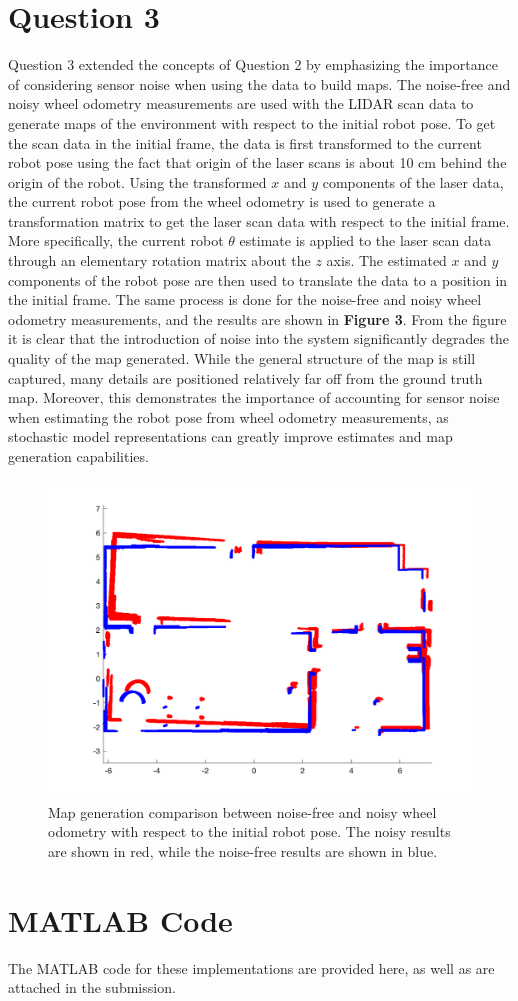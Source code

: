 \documentclass{article}
\begin{document}
\section{Question 3}
Question 3 extended the concepts of Question 2 by emphasizing the importance of considering sensor noise
when using the data to build maps. The noise-free and noisy wheel odometry measurements are
used with the LIDAR scan data to generate maps of the environment with respect to the initial robot pose.
To get the scan data in the initial frame, the data is first transformed to the current robot pose using the fact that origin of the laser scans is about 10 cm behind the origin of the robot.
Using the transformed $x$ and $y$ components of the laser data, the current robot pose from the wheel odometry is used to generate a transformation
matrix to get the laser scan data with respect to the initial frame. More specifically, the current robot $\theta$ estimate is applied
to the laser scan data through an elementary rotation matrix about the $z$ axis. The estimated $x$ and $y$ components of the robot pose are then used to
translate the data to a position in the initial frame. The same process is done for the noise-free and noisy wheel odometry measurements, and the results are shown in \textbf{Figure 3}.
From the figure it is clear that the introduction of noise into the system significantly degrades the quality of the map generated. While the general structure of the map is still captured,
many details are positioned relatively far off from the ground truth map. Moreover, this demonstrates the importance of accounting for sensor noise when estimating the robot pose from
wheel odometry measurements, as stochastic model representations can greatly improve estimates and map generation capabilities.

\begin{figure}[h!]
    \centering
    \includegraphics[width=1\textwidth]{ass1_q3.png}
    \caption{Map generation comparison between noise-free and noisy wheel odometry with respect to the initial robot pose. The noisy results are shown in red, while the noise-free results are shown in blue.}
\end{figure}

\section{MATLAB Code}

The MATLAB code for these implementations are provided here, as well as are attached in the submission.


\end{document}

